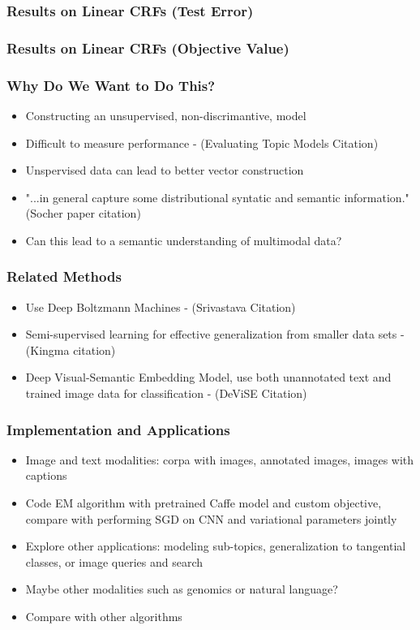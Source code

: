 \documentclass{beamer}
\begin{document}
\begin{frame}
  \frametitle{Results on Linear CRFs (Test Error)}
\end{frame}

\begin{frame}
  \frametitle{Results on Linear CRFs (Objective Value)}
\end{frame}

\begin{frame}
  \frametitle{Why Do We Want to Do This?}
  \begin{itemize}
  \item Constructing an unsupervised, non-discrimantive, model
  \item Difficult to measure performance - (Evaluating Topic Models Citation)
  \item Unspervised data can lead to better vector construction
  \item "...in general capture some distributional syntatic and semantic information." (Socher paper citation)
  \item Can this lead to a semantic understanding of multimodal data?
  \end{itemize}
\end{frame}

\begin{frame}
  \frametitle{Related Methods}
  \begin{itemize}
  \item Use Deep Boltzmann Machines - (Srivastava Citation)
  \item Semi-supervised learning for effective generalization from smaller data sets - (Kingma citation)
  \item Deep Visual-Semantic Embedding Model, use both unannotated text and trained image data for classification - (DeViSE Citation)
  \end{itemize}
\end{frame}

\begin{frame}
  \frametitle{Implementation and Applications}
  \begin{itemize}
  \item Image and text modalities: corpa with images, annotated images, images with captions
  \item Code EM algorithm with pretrained Caffe model and custom objective, compare with performing SGD on CNN and variational parameters jointly
  \item Explore other applications: modeling sub-topics, generalization to tangential classes, or image queries and search
  \item Maybe other modalities such as genomics or natural language?
  \item Compare with other algorithms
  \end{itemize}
\end{frame}

\end{document}
